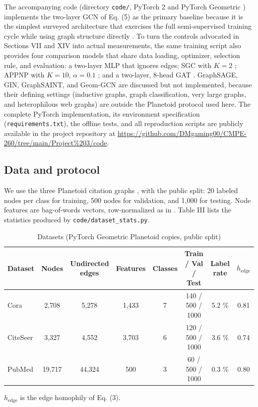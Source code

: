 \documentclass[conference]{IEEEtran}
\begin{document}
The accompanying code (directory \texttt{code/}, PyTorch 2 and PyTorch Geometric \cite{b16}) implements the two-layer GCN of Eq. (5) as the primary baseline because it is the simplest surveyed architecture that exercises the full semi-supervised training cycle while using graph structure directly \cite{b1}. To turn the controls advocated in Sections VII and XIV into actual measurements, the same training script also provides four comparison models that share data loading, optimizer, selection rule, and evaluation: a two-layer MLP that ignores edges; SGC with \(K=2\) \cite{b5}; APPNP with \(K=10\), \(\alpha=0.1\) \cite{b6}; and a two-layer, 8-head GAT \cite{b3}. GraphSAGE, GIN, GraphSAINT, and Geom-GCN are discussed but not implemented, because their defining settings (inductive graphs, graph classification, very large graphs, and heterophilous web graphs) are outside the Planetoid protocol used here. The complete PyTorch implementation, its environment specification (\texttt{requirements.txt}), the offline tests, and all reproduction scripts are publicly available in the project repository at \url{https://github.com/DMgaming00/CMPE-260/tree/main/Project\%203/code}.

\subsection{Data and protocol}

We use the three Planetoid citation graphs \cite{b12}, \cite{b13} with the public split: 20 labeled nodes per class for training, 500 nodes for validation, and 1,000 for testing. Node features are bag-of-words vectors, row-normalized as in \cite{b1}. Table III lists the statistics produced by \texttt{code/dataset\_stats.py}.

\begin{table}[!t]
\centering
\footnotesize
\renewcommand{\arraystretch}{1.15}
\caption{Datasets (PyTorch Geometric Planetoid copies, public split)}
\label{tab:3}
\begin{tabular}{lccccccc}
\hline
\textbf{Dataset} & \textbf{Nodes} & \textbf{Undirected edges} & \textbf{Features} & \textbf{Classes} & \textbf{Train / Val / Test} & \textbf{Label rate} & \textbf{\(h_{\text{edge}}\)} \\
\hline
Cora & 2,708 & 5,278 & 1,433 & 7 & 140 / 500 / 1000 & 5.2 \% & 0.81 \\
CiteSeer & 3,327 & 4,552 & 3,703 & 6 & 120 / 500 / 1000 & 3.6 \% & 0.74 \\
PubMed & 19,717 & 44,324 & 500 & 3 & 60 / 500 / 1000 & 0.3 \% & 0.80 \\
\hline
\end{tabular}
\par\vspace{2pt}\raggedright \(h_{\text{edge}}\) is the edge homophily of Eq. (3).
\end{table}
\end{document}

